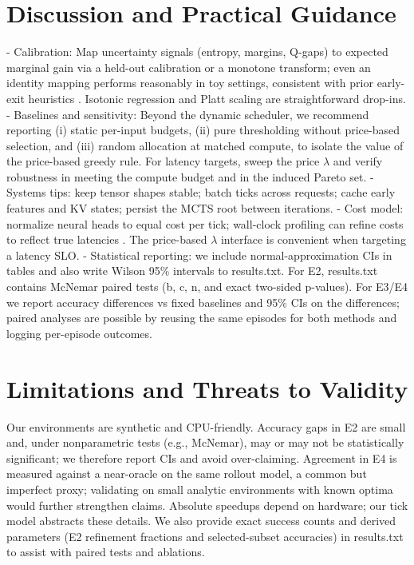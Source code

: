 \section{Discussion and Practical Guidance}
\label{sec:guidance}
- Calibration: Map uncertainty signals (entropy, margins, Q-gaps) to expected marginal gain via a held-out calibration or a monotone transform; even an identity mapping performs reasonably in toy settings, consistent with prior early-exit heuristics \cite{Kaya2019ShallowDeep,Guo2017Calibration,NiculescuMizil2005Calib}. Isotonic regression and Platt scaling \cite{Platt1999} are straightforward drop-ins.
- Baselines and sensitivity: Beyond the dynamic scheduler, we recommend reporting (i) static per-input budgets, (ii) pure thresholding without price-based selection, and (iii) random allocation at matched compute, to isolate the value of the price-based greedy rule. For latency targets, sweep the price $\lambda$ and verify robustness in meeting the compute budget and in the induced Pareto set.
- Systems tips: keep tensor shapes stable; batch ticks across requests; cache early features and KV states; persist the MCTS root between iterations.
- Cost model: normalize neural heads to equal cost per tick; wall-clock profiling can refine costs to reflect true latencies \cite{Huang2018MSDNet,Wang2018SkipNet,Figurnov2017SACT,Bolukbasi2017Adaptive}. The price-based $\lambda$ interface is convenient when targeting a latency SLO.
- Statistical reporting: we include normal-approximation CIs in tables and also write Wilson 95\% intervals to results.txt. For E2, results.txt contains McNemar paired tests (b, c, n, and exact two-sided p-values). For E3/E4 we report accuracy differences vs fixed baselines and 95\% CIs on the differences; paired analyses are possible by reusing the same episodes for both methods and logging per-episode outcomes.

\section{Limitations and Threats to Validity}
Our environments are synthetic and CPU-friendly. Accuracy gaps in E2 are small and, under nonparametric tests (e.g., McNemar), may or may not be statistically significant; we therefore report CIs and avoid over-claiming. Agreement in E4 is measured against a near-oracle on the same rollout model, a common but imperfect proxy; validating on small analytic environments with known optima would further strengthen claims. Absolute speedups depend on hardware; our tick model abstracts these details. We also provide exact success counts and derived parameters (E2 refinement fractions and selected-subset accuracies) in results.txt to assist with paired tests and ablations.

